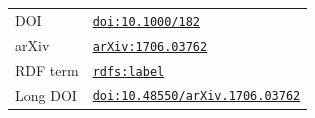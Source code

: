 \documentclass[11pt]{article}\usepackage[paperwidth=10cm,paperheight=4cm,margin=5mm]{geometry}\pagestyle{empty}
\newcommand{\doi}[1]{\href{https://doi.org/#1}{\nolinkurl{doi:#1}}}
\newcommand{\arxiv}[1]{\href{https://arxiv.org/abs/#1}{\nolinkurl{arXiv:#1}}}
\newcommand{\rdfs}[1]{\href{http://www.w3.org/2000/01/rdf-schema\#\detokenize{#1}}{\nolinkurl{rdfs:#1}}}
\begin{document}
\begin{tabular}{@{}lp{3.6cm}@{}}
  DOI      & \doi{10.1000/182} \\
  arXiv    & \arxiv{1706.03762} \\
  RDF term & \rdfs{label} \\
  Long DOI & \doi{10.48550/arXiv.1706.03762} \\
\end{tabular}
\end{document}
